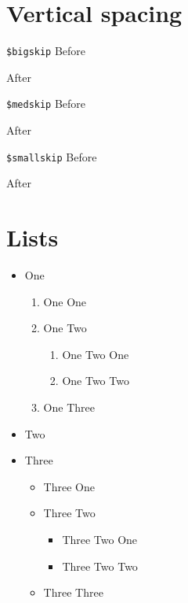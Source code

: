 \documentclass[demo]{pyscribe}
\begin{document}
\section{Vertical spacing}

\par\medskip
\texttt{\$bigskip} Before\par \bigskip After
\par\medskip
\texttt{\$medskip} Before\par \medskip After
\par\medskip
\texttt{\$smallskip} Before\par \medskip After

\section{Lists}

\par\begin{itemize}
\item One
\par\begin{enumerate}
\item One One
\item One Two
\par\begin{enumerate}
\item One Two One
\item One Two Two
\end{enumerate}\par
\item One Three
\end{enumerate}\par
\item Two
\item Three
\par\begin{itemize}
\item Three One
\item Three Two
\par\begin{itemize}
\item Three Two One
\item Three Two Two
\end{itemize}\par
\item Three Three
\end{itemize}\par
\end{itemize}\par
\end{document}

